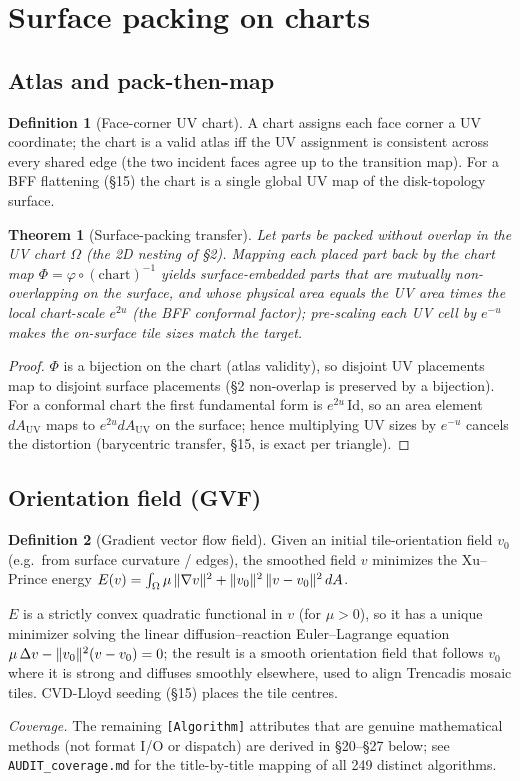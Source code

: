 \documentclass[11pt]{article}
\theoremstyle{definition}\newtheorem{definition}{Definition}[section]
\theoremstyle{plain}\newtheorem{theorem}{Theorem}[section]
\begin{document}
\section{Surface packing on charts}
\subsection{Atlas and pack-then-map}
\begin{definition}[Face-corner UV chart]
A chart assigns each face corner a UV coordinate; the chart is a valid atlas iff the UV assignment is
consistent across every shared edge (the two incident faces agree up to the transition map). For a BFF flattening
(\S15) the chart is a single global UV map of the disk-topology surface.
\end{definition}
\begin{theorem}[Surface-packing transfer]\label{thm:surfpack}
Let parts be packed without overlap in the UV chart $\Omega$ (the 2D nesting of \S2). Mapping each placed part
back by the chart map $\Phi=\varphi\circ(\text{chart})^{-1}$ yields surface-embedded parts that are mutually
non-overlapping on the surface, and whose physical area equals the UV area times the local chart-scale
$e^{2u}$ (the BFF conformal factor); pre-scaling each UV cell by $e^{-u}$ makes the on-surface tile sizes
match the target.
\end{theorem}
\begin{proof}
$\Phi$ is a bijection on the chart (atlas validity), so disjoint UV placements map to disjoint surface
placements (\S2 non-overlap is preserved by a bijection). For a conformal chart the first fundamental form is
$e^{2u}\,\mathrm{Id}$, so an area element $dA_{\mathrm{UV}}$ maps to $e^{2u}dA_{\mathrm{UV}}$ on the surface;
hence multiplying UV sizes by $e^{-u}$ cancels the distortion (barycentric transfer, \S15, is exact per
triangle).
\end{proof}
\subsection{Orientation field (GVF)}
\begin{definition}[Gradient vector flow field]
Given an initial tile-orientation field $v_0$ (e.g.\ from surface curvature / edges), the smoothed field $v$
minimizes the Xu--Prince energy $E(v)=\int_\Omega \mu\,\lVert \nabla v\rVert^2+\lVert v_0\rVert^2\,\lVert v-v_0\rVert^2\,dA$.
\end{definition}
\begin{proposition}
$E$ is a strictly convex quadratic functional in $v$ (for $\mu>0$), so it has a unique minimizer solving the
linear diffusion--reaction Euler--Lagrange equation $\mu\,\Delta v-\lVert v_0\rVert^2(v-v_0)=0$; the result is a
smooth orientation field that follows $v_0$ where it is strong and diffuses smoothly elsewhere, used to align
Trencadis mosaic tiles. CVD-Lloyd seeding (\S15) places the tile centres.
\end{proposition}
\noindent\emph{Coverage.} The remaining \texttt{[Algorithm]} attributes that are genuine mathematical methods
(not format I/O or dispatch) are derived in \S20--\S27 below; see \texttt{AUDIT\_coverage.md} for the
title-by-title mapping of all 249 distinct algorithms.
\end{document}
